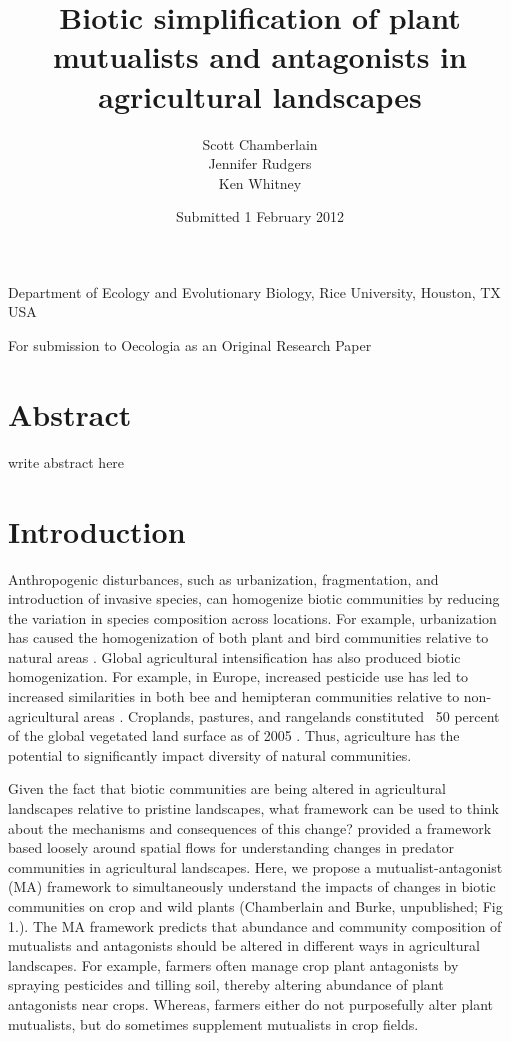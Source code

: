 \documentclass[12pt]{article}
\title{Biotic simplification of plant mutualists and antagonists in agricultural landscapes}
\author{Scott Chamberlain \\ Jennifer Rudgers \\ Ken Whitney}
\begin{document}
\maketitle

\begin{center}
Department of Ecology and Evolutionary Biology, Rice University, Houston, TX USA
\end{center}

\begin{center}
For submission to Oecologia as an Original Research Paper
\end{center}

\begin{center}
\date{Submitted 1 February 2012}
\end{center}
\newpage

\section{Abstract}

write abstract here

\section{Introduction}
Anthropogenic disturbances, such as urbanization, fragmentation, and introduction of invasive species, can homogenize biotic communities by reducing the variation in species composition across locations. For example, urbanization has caused the homogenization of both plant and bird communities relative to natural areas \citet{McKinney2006}. Global agricultural intensification has also produced biotic homogenization. For example, in Europe, increased pesticide use has led to increased similarities in both bee and hemipteran communities relative to non-agricultural areas \citet{Dormann2007}. Croplands, pastures, and rangelands constituted ~50 percent of the global vegetated land surface as of 2005 \citep{Foley2005}. Thus, agriculture has the potential to significantly impact diversity of natural communities. 

Given the fact that biotic communities are being altered in agricultural landscapes relative to pristine landscapes, what framework can be used to think about the mechanisms and consequences of this change?  \citet{Rand2006} provided a framework based loosely around spatial flows \citep[cf][]{Polis1997} for understanding changes in predator communities in agricultural landscapes.  Here, we propose a mutualist-antagonist (MA) framework to simultaneously understand the impacts of changes in biotic communities on crop and wild plants (Chamberlain and Burke, unpublished; Fig 1.). The MA framework predicts that abundance and community composition of mutualists and antagonists should be altered in different ways in agricultural landscapes.  For example, farmers often manage crop plant antagonists by spraying pesticides and tilling soil, thereby altering abundance of plant antagonists near crops.  Whereas, farmers either do not purposefully alter plant mutualists, but do sometimes supplement mutualists in crop fields. 
\end{document}
